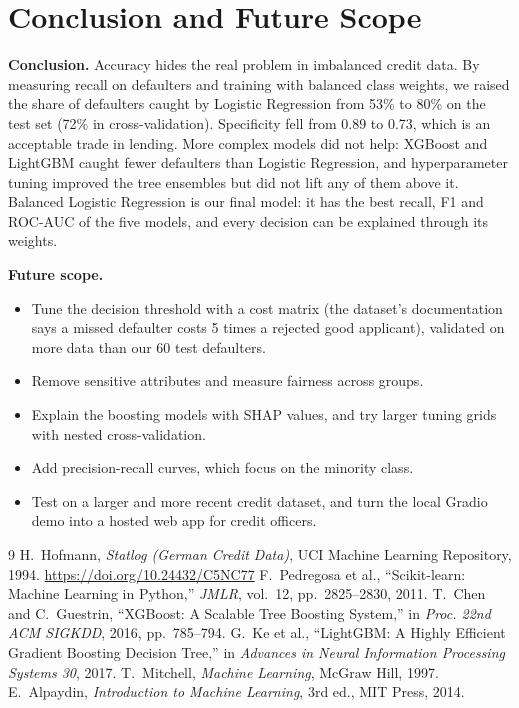 \documentclass[11pt,a4paper]{article}
\begin{document}
\section{Conclusion and Future Scope}

\textbf{Conclusion.} Accuracy hides the real problem in imbalanced credit data. By measuring recall on defaulters and training with balanced class weights, we raised the share of defaulters caught by Logistic Regression from 53\% to 80\% on the test set (72\% in cross-validation). Specificity fell from 0.89 to 0.73, which is an acceptable trade in lending. More complex models did not help: XGBoost and LightGBM caught fewer defaulters than Logistic Regression, and hyperparameter tuning improved the tree ensembles but did not lift any of them above it. Balanced Logistic Regression is our final model: it has the best recall, F1 and ROC-AUC of the five models, and every decision can be explained through its weights.

\textbf{Future scope.}
\begin{itemize}
  \item Tune the decision threshold with a cost matrix (the dataset's documentation says a missed defaulter costs 5 times a rejected good applicant), validated on more data than our 60 test defaulters.
  \item Remove sensitive attributes and measure fairness across groups.
  \item Explain the boosting models with SHAP values, and try larger tuning grids with nested cross-validation.
  \item Add precision-recall curves, which focus on the minority class.
  \item Test on a larger and more recent credit dataset, and turn the local Gradio demo into a hosted web app for credit officers.
\end{itemize}

\begin{thebibliography}{9}
 H.~Hofmann, \emph{Statlog (German Credit Data)}, UCI Machine Learning Repository, 1994. \url{https://doi.org/10.24432/C5NC77}
 F.~Pedregosa et al., ``Scikit-learn: Machine Learning in Python,'' \emph{JMLR}, vol.~12, pp.~2825--2830, 2011.
 T.~Chen and C.~Guestrin, ``XGBoost: A Scalable Tree Boosting System,'' in \emph{Proc. 22nd ACM SIGKDD}, 2016, pp.~785--794.
 G.~Ke et al., ``LightGBM: A Highly Efficient Gradient Boosting Decision Tree,'' in \emph{Advances in Neural Information Processing Systems 30}, 2017.
 T.~Mitchell, \emph{Machine Learning}, McGraw Hill, 1997.
 E.~Alpaydin, \emph{Introduction to Machine Learning}, 3rd ed., MIT Press, 2014.
\end{thebibliography}
\end{document}
